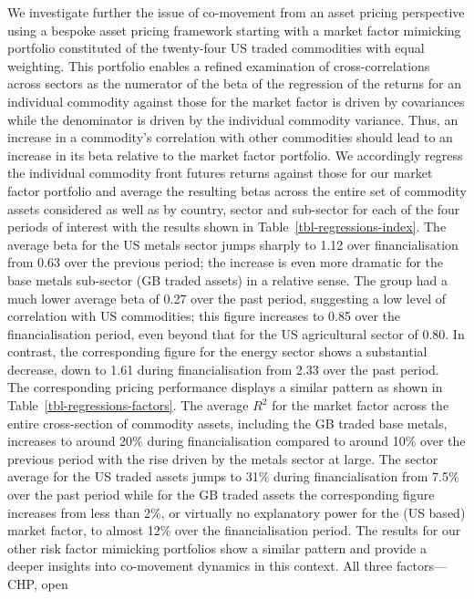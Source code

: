 \documentclass[
  authoryear,
  preprint,
  3p]{elsarticle}
\begin{document}
We investigate further the issue of co-movement from an asset pricing
perspective using a bespoke asset pricing framework starting with a
market factor mimicking portfolio constituted of the twenty-four US
traded commodities with equal weighting. This portfolio enables a
refined examination of cross-correlations across sectors as the
numerator of the beta of the regression of the returns for an individual
commodity against those for the market factor is driven by covariances
while the denominator is driven by the individual commodity variance.
Thus, an increase in a commodity's correlation with other commodities
should lead to an increase in its beta relative to the market factor
portfolio. We accordingly regress the individual commodity front futures
returns against those for our market factor portfolio and average the
resulting betas across the entire set of commodity assets considered as
well as by country, sector and sub-sector for each of the four periods
of interest with the results shown in Table~\ref{tbl-regressions-index}.
The average beta for the US metals sector jumps sharply to 1.12 over
financialisation from 0.63 over the previous period; the increase is
even more dramatic for the base metals sub-sector (GB traded assets) in
a relative sense. The group had a much lower average beta of 0.27 over
the past period, suggesting a low level of correlation with US
commodities; this figure increases to 0.85 over the financialisation
period, even beyond that for the US agricultural sector of 0.80. In
contrast, the corresponding figure for the energy sector shows a
substantial decrease, down to 1.61 during financialisation from 2.33
over the past period.\\
The corresponding pricing performance displays a similar pattern as
shown in Table~\ref{tbl-regressions-factors}. The average \(R^{2}\) for
the market factor across the entire cross-section of commodity assets,
including the GB traded base metals, increases to around 20\% during
financialisation compared to around 10\% over the previous period with
the rise driven by the metals sector at large. The sector average for
the US traded assets jumps to 31\% during financialisation from 7.5\%
over the past period while for the GB traded assets the corresponding
figure increases from less than 2\%, or virtually no explanatory power
for the (US based) market factor, to almost 12\% over the
financialisation period. The results for our other risk factor mimicking
portfolios show a similar pattern and provide a deeper insights into
co-movement dynamics in this context. All three factors---CHP, open
\end{document}
